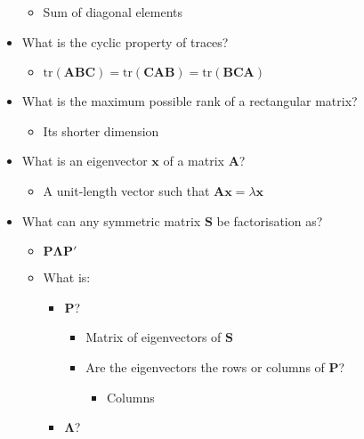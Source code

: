 \documentclass[
  letterpaper,
  DIV=11,
  numbers=noendperiod]{scrartcl}
\providecommand{\tightlist}{%
  \setlength{\itemsep}{0pt}\setlength{\parskip}{0pt}}\usepackage{longtable,booktabs,array}
\begin{document}
\begin{itemize}
  \begin{itemize}
  \tightlist
  \item
    Sum of diagonal elements
  \end{itemize}
\item
  What is the cyclic property of traces?

  \begin{itemize}
  \tightlist
  \item
    \(\mathrm{tr}(\symbf{ABC})= \mathrm{tr}(\symbf{CAB})= \mathrm{tr}(\symbf{BCA})\)
  \end{itemize}
\item
  What is the maximum possible rank of a rectangular matrix?

  \begin{itemize}
  \tightlist
  \item
    Its shorter dimension
  \end{itemize}
\item
  What is an eigenvector \(\symbf{x}\) of a matrix \(\symbf{A}\)?

  \begin{itemize}
  \tightlist
  \item
    A unit-length vector such that
    \(\symbf{A}\symbf{x}=\lambda\symbf{x}\)
  \end{itemize}
\item
  What can any symmetric matrix \(\symbf{S}\) be factorisation as?

  \begin{itemize}
  \tightlist
  \item
    \(\symbf{P}\symbf{\Lambda}\symbf{P}'\)
  \item
    What is:

    \begin{itemize}
    \tightlist
    \item
      \(\symbf{P}\)?

      \begin{itemize}
      \tightlist
      \item
        Matrix of eigenvectors of \(\symbf{S}\)
      \item
        Are the eigenvectors the rows or columns of \(\symbf{P}\)?

        \begin{itemize}
        \tightlist
        \item
          Columns
        \end{itemize}
      \end{itemize}
    \item
      \(\symbf{\Lambda}\)?


\end{itemize}
\end{itemize}
\end{itemize}
\end{document}
